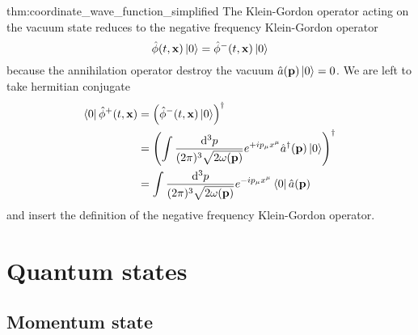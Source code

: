 \begin{delayedproof}{thm:coordinate_wave_function_simplified}
	The Klein-Gordon operator acting on the vacuum state reduces to the negative frequency Klein-Gordon operator
	\begin{equation*}
		\hat\phi(t,\vb{x})
		\ket{0}
		=
		\hat\phi^-(t,\vb{x})
		\ket{0}
	\end{equation*}
	because the annihilation operator destroy the vacuum $\hat{a}(\vb{p})\ket{0}=0$.
	We are left to take hermitian conjugate
	\begin{equation*}
		\begin{split}
			\bra{0}
			\hat\phi^+(t,\vb{x})
			&=
			\left(
				\hat\phi^-(t,\vb{x})
				\ket{0}
			\right)^\dagger
			\\
			&=
			\left(
				\int\frac{\dd[3]{p}}{(2\pi)^3\sqrt{2\omega(\vb{p})}}
				e^{+ip_\mu x^\mu}
				\hat{a}^\dagger(\vb{p})
				\ket{0}
			\right)^\dagger
			\\
			&=
			\int\frac{\dd[3]{p}}{(2\pi)^3\sqrt{2\omega(\vb{p})}}
			e^{-ip_\mu x^\mu}
			\bra{0}
			\hat{a}(\vb{p})
		\end{split}
	\end{equation*}
	and insert the definition of the negative frequency Klein-Gordon operator.
\end{delayedproof}

\section{Quantum states}

\subsection{Momentum state}

